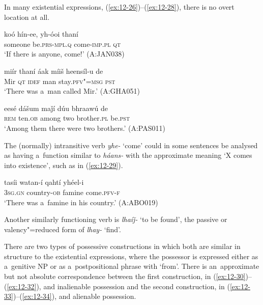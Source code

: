 In many existential expressions, (\ref{ex:12-26})--(\ref{ex:12-28}), there is no overt location at all.

\begin{exe}
\ex
\label{ex:12-26}
\gll koó hín-ee, yh-óoi thaní \\
someone be.\textsc{prs}-\textsc{mpl.q} come-\textsc{imp.pl} \textsc{qt} \\
\glt `If there is anyone, come!' (A:JAN038)
\end{exe}
\begin{exe}
\ex
\label{ex:12-27}
\gll miír thaní áak míiš heensíl-u de \\
Mir \textsc{qt} \textsc{idef} man stay.\textsc{pfv"=msg} \textsc{pst} \\
\glt `There was a~man called Mir.' (A:GHA051)
\end{exe}
\begin{exe}
\ex
\label{ex:12-28}
\gll eesé dášum maǰí dúu bhraawú de \\
\textsc{rem} ten.\textsc{ob} among two brother.\textsc{pl} be.\textsc{pst} \\
\glt `Among them there were two brothers.' (A:PAS011)
\end{exe}

The (normally) intransitive verb \textit{yhe-} `come' could in some sentences be analysed as having a~function similar to \textit{háans-} with the approximate meaning `X comes into existence', such as in (\ref{ex:12-29}).

\begin{exe}
\ex
\label{ex:12-29}
\gll tasíi watan-í qahtí yhéel-i \\
\textsc{3sg.gn} country-\textsc{ob} famine come.\textsc{pfv-f} \\
\glt `There was a~famine in his country.' (A:ABO019)
\end{exe}

Another similarly functioning verb is \textit{lhaíǰ-} `to be found', the passive or valency"=reduced form of \textit{lhay-} `find'.


 There are two types of possessive constructions in which both are similar in structure to the existential expressions, where the possessor is expressed either as a~genitive NP or as a~postpositional phrase with `from'. There is an~approximate but not absolute correspondence between the first construction, in (\ref{ex:12-30})--(\ref{ex:12-32}), and inalienable possession and the second construction, in (\ref{ex:12-33})--(\ref{ex:12-34}), and alienable possession.


